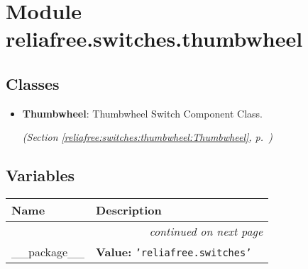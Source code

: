 %
%
%


\section{Module reliafree.switches.thumbwheel}

    \label{reliafree:switches:thumbwheel}


\subsection{Classes}

\begin{itemize}  \setlength{\parskip}{0ex}
  \item \textbf{Thumbwheel}: Thumbwheel Switch Component Class.



  \textit{(Section \ref{reliafree:switches:thumbwheel:Thumbwheel}, p.~\pageref{reliafree:switches:thumbwheel:Thumbwheel})}

\end{itemize}


  \subsection{Variables}

    \vspace{-1cm}
\hspace{\varindent}\begin{longtable}{|p{\varnamewidth}|p{\vardescrwidth}|l}
\cline{1-2}
\cline{1-2} \centering \textbf{Name} & \centering \textbf{Description}& \\
\cline{1-2}
\endhead\cline{1-2}\multicolumn{3}{r}{\small\textit{continued on next page}}\\\endfoot\cline{1-2}
\endlastfoot\raggedright \_\-\_\-p\-a\-c\-k\-a\-g\-e\-\_\-\_\- & \raggedright \textbf{Value:} 
{\tt \texttt{'}\texttt{reliafree.switches}\texttt{'}}&\\
\cline{1-2}
\end{longtable}

